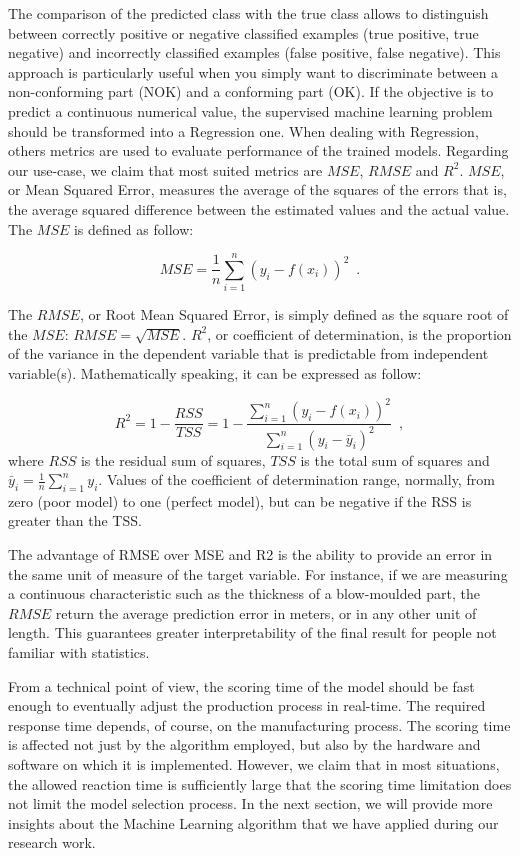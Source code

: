 The comparison of the predicted class with the true class allows to distinguish between correctly positive or negative classified examples (true positive, true negative) and incorrectly classified examples (false positive, false negative). This approach is particularly useful when you simply want to discriminate between a non-conforming part (NOK) and a conforming part (OK). If the objective is to predict a continuous numerical value, the supervised machine learning problem should be transformed into a Regression one. When dealing with Regression, others metrics are used to evaluate performance of the trained models. Regarding our use-case, we claim that most suited metrics are $MSE$, $RMSE$ and $R^2$. $MSE$, or Mean Squared Error, measures the average of the squares of the errors that is, the average squared difference between the estimated values and the actual value. The $MSE$ is defined as follow:

\begin{equation}
    MSE = \frac{1}{n}\sum_{i=1}^{n}(y_i - f(x_i))^2
    \enspace.
\end{equation}

The $RMSE$, or Root Mean Squared Error, is simply defined as the square root of the $MSE$: $RMSE = \sqrt{MSE}$. $R^2$, or coefficient of determination, is the proportion of the variance in the dependent variable that is predictable from independent variable(s). Mathematically speaking, it can be expressed as follow:

\begin{equation}
    R^2 = 1 - \frac{RSS}{TSS} = 1 - \frac{\sum_{i=1}^{n} (y_{i} - f(x_i))^{2} }{\sum_{i=1}^{n} (y_{i} - \bar{y}_{i})^{2}}
    \enspace,
\end{equation}
where $RSS$ is the residual sum of squares, $TSS$ is the total sum of squares and $\bar{y}_{i} = \frac{1}{n} \sum_{i=1}^{n} y_{i}$. Values of the coefficient of determination range, normally, from zero (poor model) to one (perfect model), but can be negative if the RSS is greater than the TSS. 

The advantage of RMSE over MSE and R2 is the ability to provide an error in the same unit of measure of the target variable. For instance, if we are measuring a continuous characteristic such as the thickness of a blow-moulded part, the $RMSE$ return the average prediction error in meters, or in any other unit of length. This guarantees greater interpretability of the final result for people not familiar with statistics.

From a technical point of view, the scoring time of the model should be fast enough to eventually adjust the production process in real-time. The required response time depends, of course, on the manufacturing process. The scoring time is affected not just by the algorithm employed, but also by the hardware and software on which it is implemented. However, we claim that in most situations, the allowed reaction time is sufficiently large that the scoring time limitation does not limit the model selection process. In the next section, we will provide more insights about the Machine Learning algorithm that we have applied during our research work.

